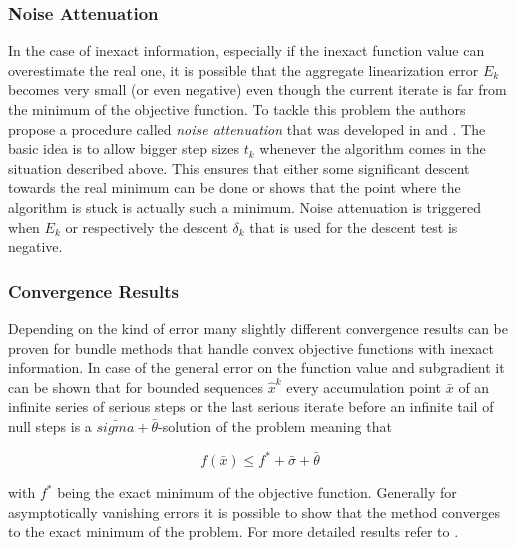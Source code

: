 \subsubsection{Noise Attenuation}

In the case of inexact information, especially if the inexact function value can overestimate the real one, it is possible that the aggregate linearization error \(E_k\) becomes very small (or even negative) even though the current iterate is far from the minimum of the objective function.
To tackle this problem the authors propose a procedure called \emph{noise attenuation} that was developed in \cite{Hintermueller2001} and \cite{Kiwiel2006}.
The basic idea is to allow bigger step sizes \(t_k\) whenever the algorithm comes in the situation described above. This ensures that either some significant descent towards the real minimum can be done or shows that the point where the algorithm is stuck is actually such a minimum.
Noise attenuation is triggered when \(E_k\) or respectively the descent \(\delta_k\) that is used for the descent test is negative.

\subsubsection{Convergence Results}
Depending on the kind of error many slightly different convergence results can be proven for bundle methods that handle convex objective functions with inexact information.
In case of the general error on the function value and subgradient it can be shown that for bounded sequences \(\hat{x}^k\) every accumulation point \(\bar{x}\) of an infinite series of serious steps or the last serious iterate before an infinite tail of null steps is a \(\bar{sigma}+\bar{\theta}\)-solution of the problem meaning that 

\begin{equation}
	f(\bar{x}) \leq f^*+\bar{\sigma}+\bar{\theta} 
\end{equation}

with \(f^*\) being the exact minimum of the objective function.
Generally for asymptotically vanishing errors it is possible to show that the method converges to the exact minimum of the problem.
For more detailed results refer to \cite{Oliveira2014}.


